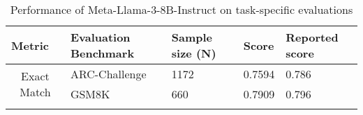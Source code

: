 

\begin{table}[h!]
\centering
\caption{Performance of Meta-Llama-3-8B-Instruct on task-specific evaluations}
\begin{tabular}{lllll}
\hline
\multicolumn{1}{|l|}{Metric}                         & \multicolumn{1}{l|}{Evaluation   Benchmark} & \multicolumn{1}{l|}{Sample size (N)} & \multicolumn{1}{l|}{Score}  & \multicolumn{1}{l|}{Reported score} \\ \hline
\multicolumn{1}{|c|}{\multirow{2}{*}{Exact   Match}} & \multicolumn{1}{l|}{ARC-Challenge}          & \multicolumn{1}{l|}{1172}            & \multicolumn{1}{l|}{0.7594} & \multicolumn{1}{l|}{0.786}          \\ \cline{2-5} 
\multicolumn{1}{|c|}{}                               & \multicolumn{1}{l|}{GSM8K}                  & \multicolumn{1}{l|}{660}             & \multicolumn{1}{l|}{0.7909} & \multicolumn{1}{l|}{0.796}          \\ \hline
\label{tab:TraceBenchmarkPreEval}
\end{tabular}
\end{table}

